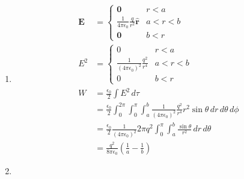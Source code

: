 \documentclass{article}
\renewcommand{\vec}[1]{\boldsymbol{\mathbf{#1}}}
\newcommand{\uvec}[1]{\hat{\vec{#1}}}
\newcommand{\ke}{\frac{1}{4 \pi \epsilon_0}}
\begin{document}
\begin{enumerate}
  \item

        \begin{align*}
          \vec{E} & = \begin{cases}
                        \vec{0}                    & r < a     \\
                        \ke \frac{q}{r^2} \uvec{r} & a < r < b \\
                        \vec{0}                    & b < r
                      \end{cases}                                                                                                           \\
          E^2     & = \begin{cases}
                        0                                              & r < a     \\
                        \frac{1}{(4 \pi \epsilon_0)^2} \frac{q^2}{r^4} & a < r < b \\
                        0                                              & b < r
                      \end{cases}                                                                                       \\
          W       & = \frac{\epsilon_0}{2} \int E^2 \,d \tau                                                                                                           \\
                  & = \frac{\epsilon_0}{2} \int_0^{2 \pi} \int_0^\pi \int_a^b \frac{1}{(4 \pi \epsilon_0)^2} \frac{q^2}{r^4} r^2 \sin \theta \,d r \,d \theta \,d \phi \\
                  & = \frac{\epsilon_0}{2} \frac{1}{(4 \pi \epsilon_0)^2} 2 \pi q^2 \int_0^\pi \int_a^b \frac{\sin \theta}{r^2} \,d r \,d \theta                       \\
                  & = \frac{q^2}{8 \pi \epsilon_0} \left( \frac{1}{a} - \frac{1}{b} \right)
        \end{align*}

  \item


\end{enumerate}
\end{document}
